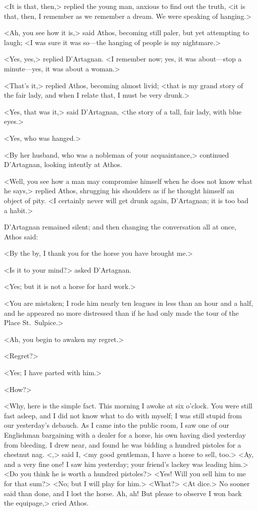 <It is that, then,> replied the young man, anxious to find out the truth, <it is that, then, I remember as we remember a dream. We were speaking of hanging.> 

<Ah, you see how it is,> said Athos, becoming still paler, but yet attempting to laugh; <I was sure it was so—the hanging of people is my nightmare.> 

<Yes, yes,> replied D'Artagnan. <I remember now; yes, it was about—stop a minute—yes, it was about a woman.> 

<That's it,> replied Athos, becoming almost livid; <that is my grand story of the fair lady, and when I relate that, I must be very drunk.> 

<Yes, that was it,> said D'Artagnan, <the story of a tall, fair lady, with blue eyes.> 

<Yes, who was hanged.> 

<By her husband, who was a nobleman of your acquaintance,> continued D'Artagnan, looking intently at Athos. 

<Well, you see how a man may compromise himself when he does not know what he says,> replied Athos, shrugging his shoulders as if he thought himself an object of pity. <I certainly never will get drunk again, D'Artagnan; it is too bad a habit.> 

D'Artagnan remained silent; and then changing the conversation all at once, Athos said: 

<By the by, I thank you for the horse you have brought me.> 

<Is it to your mind?> asked D'Artagnan. 

<Yes; but it is not a horse for hard work.> 

<You are mistaken; I rode him nearly ten leagues in less than an hour and a half, and he appeared no more distressed than if he had only made the tour of the Place St.~Sulpice.> 

<Ah, you begin to awaken my regret.> 

<Regret?> 

<Yes; I have parted with him.> 

<How?> 

<Why, here is the simple fact. This morning I awoke at six o'clock. You were still fast asleep, and I did not know what to do with myself; I was still stupid from our yesterday's debauch. As I came into the public room, I saw one of our Englishman bargaining with a dealer for a horse, his own having died yesterday from bleeding. I drew near, and found he was bidding a hundred pistoles for a chestnut nag. <,> said I, <my good gentleman, I have a horse to sell, too.> <Ay, and a very fine one! I saw him yesterday; your friend's lackey was leading him.> <Do you think he is worth a hundred pistoles?> <Yes! Will you sell him to me for that sum?> <No; but I will play for him.> <What?> <At dice.> No sooner said than done, and I lost the horse. Ah, ah! But please to observe I won back the equipage,> cried Athos. 

